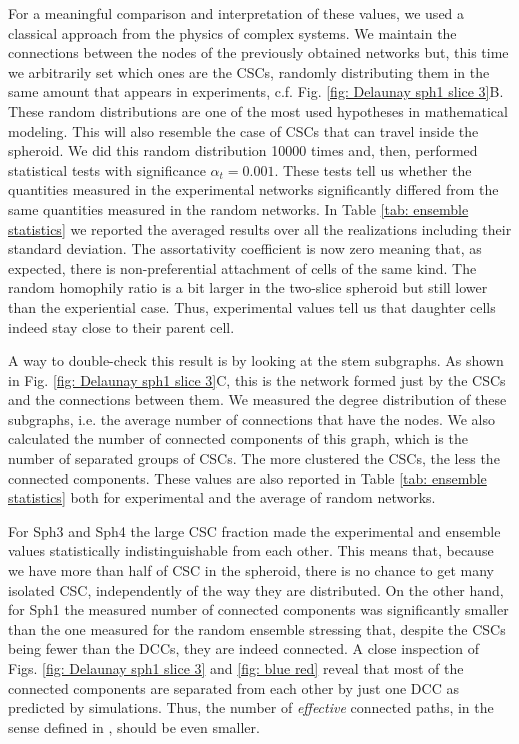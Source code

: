 \documentclass[fleqn,10pt]{wlscirep}
\begin{document}
For a meaningful comparison and interpretation of these values, we used a classical approach from the physics of complex systems. We maintain the connections between the nodes of the previously obtained networks but, this time we arbitrarily set which ones are the CSCs, randomly distributing them in the same amount that appears in experiments, c.f. Fig. \ref{fig: Delaunay sph1 slice 3}B. These random distributions are one of the most used hypotheses in mathematical modeling. This will also resemble the case of CSCs that can travel inside the spheroid. We did this random distribution 10000 times and, then, performed statistical tests with significance $\alpha_t=0.001$. These tests tell us whether the quantities measured in the experimental networks significantly differed from the same quantities measured in the random networks. In Table \ref{tab: ensemble statistics} we reported the averaged results over all the realizations including their standard deviation. The assortativity coefficient is now zero meaning that, as expected, there is non-preferential attachment of cells of the same kind. The random homophily ratio is a bit larger in the two-slice spheroid but still lower than the experiential case. Thus, experimental values tell us that daughter cells indeed stay close to their parent cell. 

A way to double-check this result is by looking at the stem subgraphs. As shown in Fig. \ref{fig: Delaunay sph1 slice 3}C, this is the network formed just by the CSCs and the connections between them. We measured the degree distribution of these subgraphs, i.e. the average number of connections that have the nodes. We also calculated the number of connected components of this graph, which is the number of separated groups of CSCs. The more clustered the CSCs, the less the connected components. These values are also reported in Table \ref{tab: ensemble statistics} both for experimental and the average of random networks.

For {\textsf Sph3} and {\textsf Sph4} the large CSC fraction made the experimental and ensemble values statistically indistinguishable from each other. This means that, because we have more than half of CSC in the spheroid, there is no chance to get many isolated CSC, independently of the way they are distributed. 
On the other hand, for {\textsf Sph1} the measured number of connected components was significantly smaller than the one measured for the random ensemble stressing that, despite the CSCs being fewer than the DCCs, they are indeed connected. A close inspection of Figs. \ref{fig: Delaunay sph1 slice 3} and \ref{fig: blue red} reveal that most of the connected components are separated from each other by just one DCC as predicted by simulations. Thus, the number of \emph{effective} connected paths, in the sense defined in \cite{barberis2021percolation}, should be even smaller.
\end{document}
